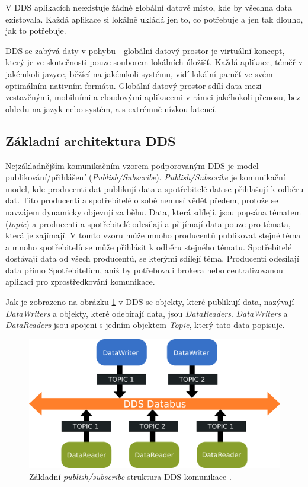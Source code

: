 V \acs{DDS} aplikacích neexistuje žádné globální datové místo, kde by všechna data existovala. Každá aplikace si lokálně ukládá jen to, co potřebuje a jen tak dlouho, jak to potřebuje. \cite{DDS_Main}

\acs{DDS} se zabývá daty v pohybu - globální datový prostor je virtuální koncept, který je ve skutečnosti pouze souborem lokálních úložišť. Každá aplikace, téměř v jakémkoli jazyce, běžící na jakémkoli systému, vidí lokální paměť ve svém optimálním nativním formátu. Globální datový prostor sdílí data mezi vestavěnými, mobilními a cloudovými aplikacemi v rámci jakéhokoli přenosu, bez ohledu na jazyk nebo systém, a s extrémně nízkou latencí.

\subsection{Základní architektura \acs{DDS}}

Nejzákladnějším komunikačním vzorem podporovaným \acs{DDS} je model publikování/přihlášení (\textit{Publish/Subscribe}). \textit{Publish/Subscribe} je komunikační model, kde producenti dat publikují data a spotřebitelé dat se přihlašují k odběru dat. Tito producenti a spotřebitelé o sobě nemusí vědět předem, protože se navzájem dynamicky objevují za běhu. Data, která sdílejí, jsou popsána tématem (\textit{topic}) a producenti a spotřebitelé odesílají a přijímají data pouze pro témata, která je zajímají. V tomto vzoru může mnoho producentů publikovat stejné téma a mnoho spotřebitelů se může přihlásit k odběru stejného tématu. Spotřebitelé dostávají data od všech producentů, se kterými sdílejí téma. Producenti odesílají data přímo Spotřebitelům, aniž by potřebovali brokera nebo centralizovanou aplikaci pro zprostředkování komunikace. \cite{DDS_PubSub}

Jak je zobrazeno na obrázku \ref{fig:DDSarch} v \acs{DDS} se objekty, které publikují data, nazývají \textit{DataWriters} a objekty, které odebírají data, jsou \textit{DataReaders}. \textit{DataWriters} a \textit{DataReaders} jsou spojeni s jedním objektem \textit{Topic}, který tato data popisuje.

\begin{figure}[!ht]
  \begin{center}
    \includegraphics[scale=0.35]{obrazky/DDS2}
  \end{center}
  \caption[Základní \textit{publish/subscribe} struktura \acs{DDS} komunikace]{Základní \textit{publish/subscribe} struktura \acs{DDS} komunikace \cite{DDS_PubSub}.}
  \label{fig:DDSarch}
\end{figure}

